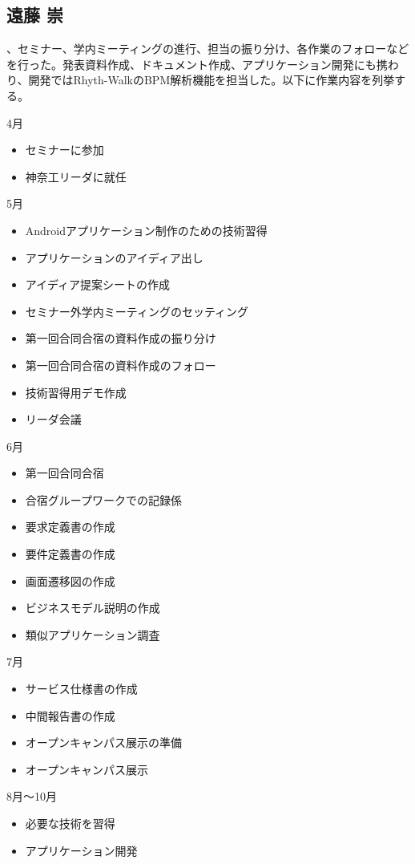 \subsection{遠藤 崇}
、セミナー、学内ミーティングの進行、担当の振り分け、各作業のフォローなどを行った。発表資料作成、ドキュメント作成、アプリケーション開発にも携わり、開発ではRhyth-WalkのBPM解析機能を担当した。以下に作業内容を列挙する。

4月
\begin{itemize}
\item セミナーに参加
\item 神奈工リーダに就任
\end{itemize}
5月
\begin{itemize}
\item Androidアプリケーション制作のための技術習得
\item アプリケーションのアイディア出し
\item アイディア提案シートの作成
\item セミナー外学内ミーティングのセッティング
\item 第一回合同合宿の資料作成の振り分け
\item 第一回合同合宿の資料作成のフォロー
\item 技術習得用デモ作成
\item リーダ会議
\end{itemize}
6月
\begin{itemize}
\item 第一回合同合宿
\item 合宿グループワークでの記録係
\item 要求定義書の作成
\item 要件定義書の作成
\item 画面遷移図の作成
\item ビジネスモデル説明の作成
\item 類似アプリケーション調査
\end{itemize}
7月
\begin{itemize}
\item サービス仕様書の作成
\item 中間報告書の作成
\item オープンキャンパス展示の準備
\item オープンキャンパス展示
\end{itemize}
8月～10月
\begin{itemize}
\item 必要な技術を習得
\item アプリケーション開発
\end{itemize}
